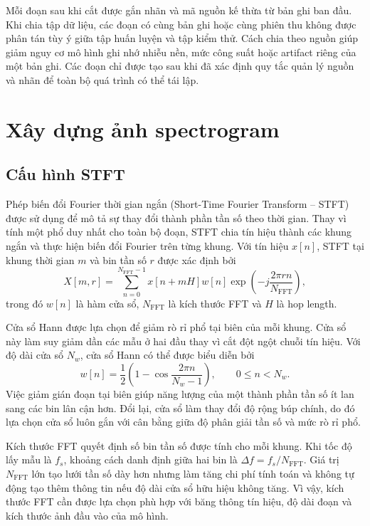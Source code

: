 \documentclass[../DoAn.tex]{subfiles}
\begin{document}
Mỗi đoạn sau khi cắt được gắn nhãn và mã nguồn kế thừa từ bản ghi ban đầu. Khi chia tập dữ liệu, các đoạn có cùng bản ghi hoặc cùng phiên thu không được phân tán tùy ý giữa tập huấn luyện và tập kiểm thử. Cách chia theo nguồn giúp giảm nguy cơ mô hình ghi nhớ nhiễu nền, mức công suất hoặc artifact riêng của một bản ghi. Các đoạn chỉ được tạo sau khi đã xác định quy tắc quản lý nguồn và nhãn để toàn bộ quá trình có thể tái lập.

\section{Xây dựng ảnh spectrogram}

\subsection{Cấu hình STFT}

Phép biến đổi Fourier thời gian ngắn (Short-Time Fourier Transform -- STFT) được sử dụng để mô tả sự thay đổi thành phần tần số theo thời gian. Thay vì tính một phổ duy nhất cho toàn bộ đoạn, STFT chia tín hiệu thành các khung ngắn và thực hiện biến đổi Fourier trên từng khung. Với tín hiệu $x[n]$, STFT tại khung thời gian $m$ và bin tần số $r$ được xác định bởi
\begin{equation}
    X[m,r]
    =
    \sum_{n=0}^{N_{\mathrm{FFT}}-1}
    x[n+mH]w[n]
    \exp
    \left(
        -j\frac{2\pi rn}{N_{\mathrm{FFT}}}
    \right),
\end{equation}
trong đó $w[n]$ là hàm cửa sổ, $N_{\mathrm{FFT}}$ là kích thước FFT và $H$ là hop length.

Cửa sổ Hann được lựa chọn để giảm rò rỉ phổ tại biên của mỗi khung. Cửa sổ này làm suy giảm dần các mẫu ở hai đầu thay vì cắt đột ngột chuỗi tín hiệu. Với độ dài cửa sổ $N_w$, cửa sổ Hann có thể được biểu diễn bởi
\begin{equation}
    w[n]
    =
    \frac{1}{2}
    \left(
        1-\cos\frac{2\pi n}{N_w-1}
    \right),
    \qquad 0\leq n<N_w.
\end{equation}
Việc giảm gián đoạn tại biên giúp năng lượng của một thành phần tần số ít lan sang các bin lân cận hơn. Đổi lại, cửa sổ làm thay đổi độ rộng búp chính, do đó lựa chọn cửa sổ luôn gắn với cân bằng giữa độ phân giải tần số và mức rò rỉ phổ.

Kích thước FFT quyết định số bin tần số được tính cho mỗi khung. Khi tốc độ lấy mẫu là $f_s$, khoảng cách danh định giữa hai bin là $\Delta f=f_s/N_{\mathrm{FFT}}$. Giá trị $N_{\mathrm{FFT}}$ lớn tạo lưới tần số dày hơn nhưng làm tăng chi phí tính toán và không tự động tạo thêm thông tin nếu độ dài cửa sổ hữu hiệu không tăng. Vì vậy, kích thước FFT cần được lựa chọn phù hợp với băng thông tín hiệu, độ dài đoạn và kích thước ảnh đầu vào của mô hình.
\end{document}
